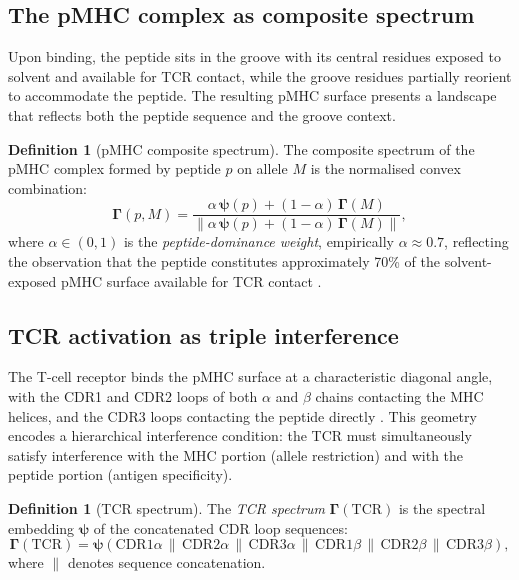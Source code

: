 \documentclass[twocolumn,11pt,a4paper]{article}
\theoremstyle{definition}
\newtheorem{definition}[theorem]{Definition}
\theoremstyle{remark}
\newcommand{\norm}[1]{\left\| #1 \right\|}
\begin{document}
\subsection{The pMHC complex as composite spectrum}
\label{sec:pmhc_composite}

Upon binding, the peptide sits in the groove with its central residues exposed
to solvent and available for TCR contact, while the groove residues partially
reorient to accommodate the peptide. The resulting pMHC surface presents a
landscape that reflects both the peptide sequence and the groove context.

\begin{definition}[pMHC composite spectrum]
\label{def:pmhc_composite}
The composite spectrum of the pMHC complex formed by peptide $p$ on allele
$M$ is the normalised convex combination:
\begin{equation}
  \bm{\Gamma}(p,M)
  = \frac{\alpha\,\bm{\psi}(p) + (1-\alpha)\,\bm{\Gamma}(M)}
         {\norm{\alpha\,\bm{\psi}(p) + (1-\alpha)\,\bm{\Gamma}(M)}},
  \label{eq:pmhc_composite}
\end{equation}
where $\alpha \in (0,1)$ is the \emph{peptide-dominance weight}, empirically
$\alpha \approx 0.7$, reflecting the observation that the peptide constitutes
approximately 70\% of the solvent-exposed pMHC surface available for TCR
contact \citep{neefjes2011}.
\end{definition}

\subsection{TCR activation as triple interference}
\label{sec:tcr_activation}

The T-cell receptor binds the pMHC surface at a characteristic diagonal angle,
with the CDR1 and CDR2 loops of both $\alpha$ and $\beta$ chains contacting
the MHC helices, and the CDR3 loops contacting the peptide directly
\citep{davis1988}. This geometry encodes a hierarchical interference condition:
the TCR must simultaneously satisfy interference with the MHC portion (allele
restriction) and with the peptide portion (antigen specificity).

\begin{definition}[TCR spectrum]
\label{def:tcr_spectrum}
The \emph{TCR spectrum} $\bm{\Gamma}(\mathrm{TCR})$ is the spectral
embedding $\bm{\psi}$ of the concatenated CDR loop sequences:
\begin{equation}
  \bm{\Gamma}(\mathrm{TCR})
  = \bm{\psi}(\mathrm{CDR1}\alpha \,\|\,
              \mathrm{CDR2}\alpha \,\|\,
              \mathrm{CDR3}\alpha \,\|\,
              \mathrm{CDR1}\beta  \,\|\,
              \mathrm{CDR2}\beta  \,\|\,
              \mathrm{CDR3}\beta),
  \label{eq:tcr_spectrum}
\end{equation}
where $\|$ denotes sequence concatenation.
\end{definition}
\end{document}
